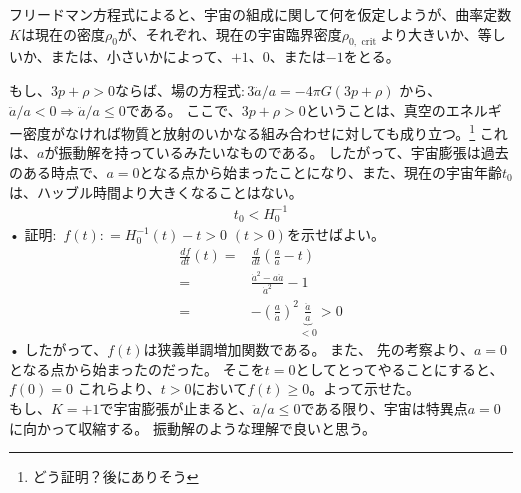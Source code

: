 \documentclass[11pt,a4paper,dvipdfmx]{jsarticle}
\theoremstyle{plain}
\theoremstyle{break}
\begin{document}
フリードマン方程式によると、宇宙の組成に関して何を仮定しようが、曲率定数 $K$は現在の密度$\rho_0$が、それぞれ、現在の宇宙臨界密度$ \rho_{0, \text { crit }} $より大きいか、等しいか、または、小さいかによって、$+1$、$0$、または$-1$をとる。

もし、$3p + \rho > 0$ならば、場の方程式$:3\ddot{a}/{a}=-4 \pi G(3 p+\rho)$ から、$\ddot{a}/{a} < 0 \Rightarrow \ddot{a}/{a} \leq 0 $である。
ここで、$3p + \rho > 0$ということは、真空のエネルギー密度がなければ物質と放射のいかなる組み合わせに対しても成り立つ。\footnote{どう証明？後にありそう}
これは、$a$が振動解を持っているみたいなものである。
したがって、宇宙膨張は過去のある時点で、$a=0$となる点から始まったことになり、また、現在の宇宙年齢$t_0$は、ハッブル時間より大きくなることはない。
\begin{align*}
  t_0 < H_0^{-1}
\end{align*}•%
証明:\,  $f(t): = H_0^{-1} (t) - t > 0 \,\, (t >0)$を示せばよい。 
\begin{align}
 \frac{d f}{dt}(t)
   =& \frac{d}{dt} ( \frac{a}{\dot{a}} -t)\\
   =& \frac{\dot{a}^2 - a \ddot{a}}{\dot{a}^2} -1\\
   =& - \left(  \frac{a}{\dot{a}} \right)^2  \underbrace{\frac{\ddot{a}}{a}}_{<0} >0
   \end{align}•%
したがって、$f(t)$は狭義単調増加関数である。
また、
先の考察より、$a=0$となる点から始まったのだった。
そこを$t=0$としてとってやることにすると、$f(0)=0$
これらより、$t>0$において$f(t) \geq 0$。よって示せた。 \\
\noindent
もし、$K = +1$で宇宙膨張が止まると、$\ddot{a}/{a} \leq 0$である限り、宇宙は特異点$a = 0$に向かって収縮する。
振動解のような理解で良いと思う。
\end{document}
